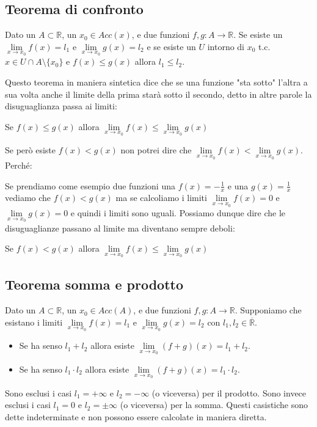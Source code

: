 \subsection{Teorema di confronto}
\begin{theorem}
    Dato un $A \subset \mathbb{R}$, un $x_0 \in Acc(x)$, e due funzioni $f,g: A \to \mathbb{R}$. Se esiste un $\lim\limits_{x\to x_0}f(x) = l_1$ e $\lim\limits_{x\to x_0}g(x) = l_2$ e se esiste un $U$ intorno di $x_0$ t.c. $x \in U \cap A \setminus \{x_0\}$ e $f(x) \leq g(x)$ allora $l_1 \leq l_2$.
\end{theorem}
Questo teorema in maniera sintetica dice che se una funzione "sta sotto" l'altra a sua volta anche il limite della prima starà sotto il secondo, detto in altre parole la disuguaglianza passa ai limiti:
\begin{center}
    Se $f(x) \leq g(x)$ allora $\lim\limits_{x\to x_0}f(x) \leq \lim\limits_{x\to x_0}g(x)$
\end{center}

\begin{observation}
    Se però esiste $f(x) < g(x)$ non potrei dire che $\lim\limits_{x\to x_0}f(x) < \lim\limits_{x\to x_0}g(x)$. Perché:
\end{observation}
Se prendiamo come esempio due funzioni una $f(x) = -\frac{1}{x}$ e una $g(x) = \frac{1}{x}$ vediamo che $f(x) < g(x)$ ma se calcoliamo i limiti $\lim\limits_{x\to x_0}f(x) = 0$ e $\lim\limits_{x\to x_0}g(x) = 0$ e quindi i limiti sono uguali. Possiamo dunque dire che le disuguaglianze passano al limite ma diventano sempre deboli:
\begin{center}
        Se $f(x) < g(x)$ allora $\lim\limits_{x\to x_0}f(x) \leq \lim\limits_{x\to x_0}g(x)$
\end{center}

\subsection{Teorema somma e prodotto}
\begin{theorem}
    Dato un $A \subset \mathbb{R}$, un $x_0 \in Acc(A)$, e due funzioni $f,g: A \to \mathbb{R}$. Supponiamo che esistano i limiti $\lim\limits_{x\to x_0}f(x) = l_1$ e $\lim\limits_{x\to x_0}g(x) = l_2$ con $l_1, l_2 \in \overline{\mathbb{R}}$.
    \begin{itemize}
        \item Se ha senso $l_1 + l_2$ allora esiste $\lim\limits_{x\to x_0}(f + g)(x) = l_1 + l_2$.
        \item Se ha senso $l_1 \cdot l_2$ allora esiste $\lim\limits_{x\to x_0}(f + g)(x) = l_1 \cdot l_2$.
    \end{itemize}
\end{theorem}
\begin{note}
Sono esclusi i casi $l_1 = +\infty$ e $l_2 = -\infty$ (o viceversa) per il prodotto. Sono invece esclusi i casi $l_1 = 0$ e $l_2 = \pm\infty$ (o viceversa) per la somma. Questi casistiche sono dette indeterminate e non possono essere calcolate in maniera diretta.
\end{note}

